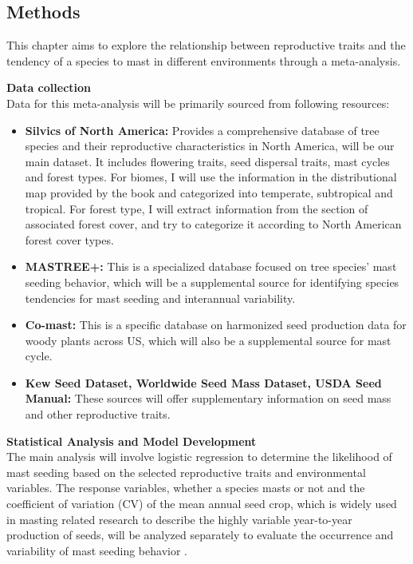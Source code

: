 \documentclass[11pt,letter]{article}
\begin{document}
\subsection{Methods}
This chapter aims to explore the relationship between reproductive traits and the tendency of a species to mast in different environments through a meta-analysis.\par %
\textbf{Data collection}\\
Data for this meta-analysis will be primarily sourced from following resources:
	\begin{itemize}
	\item \textbf{Silvics of North America:} Provides a comprehensive database of tree species and their reproductive characteristics in North America, will be our main dataset. It includes flowering traits, seed dispersal traits, mast cycles and forest types. For biomes, I will use the information in the distributional map provided by the book and categorized into temperate, subtropical and tropical. For forest type, I will extract information from the section of associated forest cover, and try to categorize it according to North American forest cover types.
	\item \textbf{MASTREE+:} This is a specialized database focused on tree species' mast seeding behavior, which will be a supplemental source for identifying species tendencies for mast seeding and interannual variability.
	\item \textbf{Co-mast:} This is a specific database on harmonized seed production data for woody plants across US, which will also be a supplemental source for mast cycle.
	\item \textbf{Kew Seed Dataset, Worldwide Seed Mass Dataset, USDA Seed Manual:} These sources will offer supplementary information on seed mass and other reproductive traits.
	\end{itemize}
\textbf{Statistical Analysis and Model Development}\\
The main analysis will involve logistic regression to determine the likelihood of mast seeding based on the selected reproductive traits and environmental variables. The response variables, whether a species masts or not and the coefficient of variation (CV) of the mean annual seed crop,  which is widely used in masting related research to describe the highly variable year-to-year production of seeds, will be analyzed separately to evaluate the occurrence and variability of mast seeding behavior \citep{kelly2002mast}.
\end{document}
